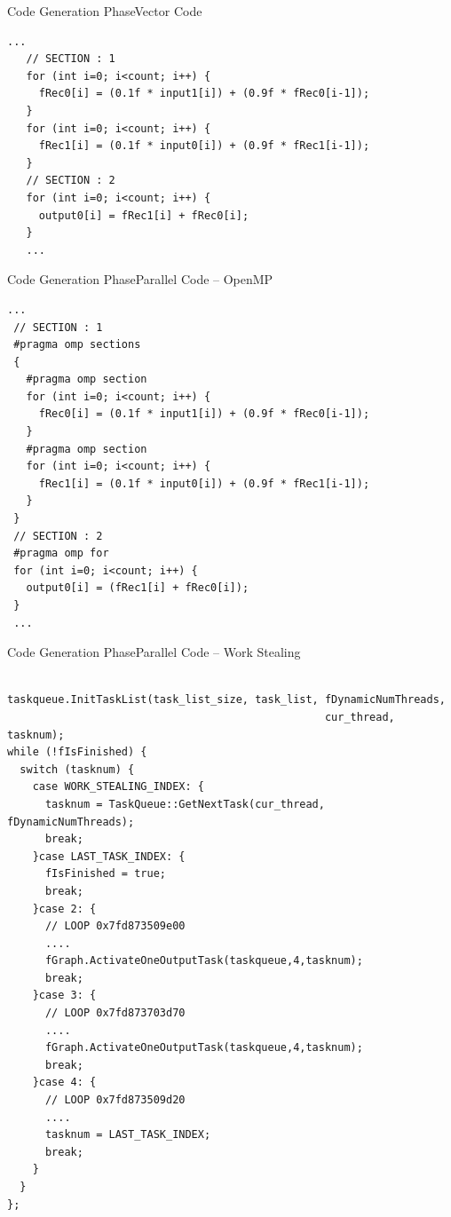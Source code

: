  
 
 
\begin{frame}[fragile]{Code Generation Phase}{Vector Code}
\begin{lstlisting}[basicstyle=\ttfamily\tiny\color{yotxt}]
   ...
   // SECTION : 1
   for (int i=0; i<count; i++) {
     fRec0[i] = (0.1f * input1[i]) + (0.9f * fRec0[i-1]);
   }
   for (int i=0; i<count; i++) {
     fRec1[i] = (0.1f * input0[i]) + (0.9f * fRec1[i-1]);
   }
   // SECTION : 2
   for (int i=0; i<count; i++) {
     output0[i] = fRec1[i] + fRec0[i];
   }
   ...
\end{lstlisting}
\end{frame}
 
 

 
\begin{frame}[fragile]{Code Generation Phase}{Parallel Code -- OpenMP}
\begin{lstlisting}[basicstyle=\ttfamily\tiny\color{yotxt}]
 ...
 // SECTION : 1
 #pragma omp sections 
 { 
   #pragma omp section 
   for (int i=0; i<count; i++) {
     fRec0[i] = (0.1f * input1[i]) + (0.9f * fRec0[i-1]);
   }
   #pragma omp section 
   for (int i=0; i<count; i++) {
     fRec1[i] = (0.1f * input0[i]) + (0.9f * fRec1[i-1]);
   }
 } 
 // SECTION : 2
 #pragma omp for 
 for (int i=0; i<count; i++) {
   output0[i] = (fRec1[i] + fRec0[i]);
 }
 ...
\end{lstlisting}
\end{frame}

\begin{frame}[fragile]{Code Generation Phase}{Parallel Code -- Work Stealing}
\begin{lstlisting}[basicstyle=\ttfamily\tiny\color{yotxt}]

taskqueue.InitTaskList(task_list_size, task_list, fDynamicNumThreads, 
                                                  cur_thread, tasknum);
while (!fIsFinished) {
  switch (tasknum) {
    case WORK_STEALING_INDEX: { 
      tasknum = TaskQueue::GetNextTask(cur_thread, fDynamicNumThreads);
      break;
    }case LAST_TASK_INDEX: { 
      fIsFinished = true;
      break;
    }case 2: { 
      // LOOP 0x7fd873509e00
      ....
      fGraph.ActivateOneOutputTask(taskqueue,4,tasknum);
      break;
    }case 3: { 
      // LOOP 0x7fd873703d70
      ....				
      fGraph.ActivateOneOutputTask(taskqueue,4,tasknum);
      break;
    }case 4: { 
      // LOOP 0x7fd873509d20
      ....
      tasknum = LAST_TASK_INDEX;
      break;
    } 
  }
};
\end{lstlisting}
\end{frame}

